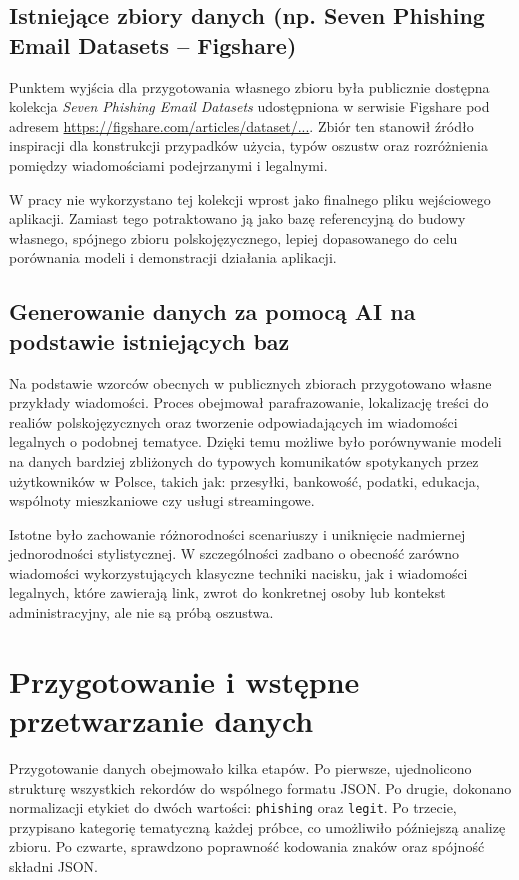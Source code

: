 \documentclass[12pt,a4paper,openany]{report}
\begin{document}
\subsection{Istniejące zbiory danych (np. Seven Phishing Email Datasets -- Figshare)}

Punktem wyjścia dla przygotowania własnego zbioru była publicznie dostępna kolekcja \textit{Seven Phishing Email Datasets} udostępniona w serwisie Figshare pod adresem \href{https://figshare.com/articles/dataset/Seven_Phishing_Email_Datasets/25432108}{https://figshare.com/articles/dataset/...}. Zbiór ten stanowił źródło inspiracji dla konstrukcji przypadków użycia, typów oszustw oraz rozróżnienia pomiędzy wiadomościami podejrzanymi i legalnymi.

W pracy nie wykorzystano tej kolekcji wprost jako finalnego pliku wejściowego aplikacji. Zamiast tego potraktowano ją jako bazę referencyjną do budowy własnego, spójnego zbioru polskojęzycznego, lepiej dopasowanego do celu porównania modeli i demonstracji działania aplikacji.

\subsection{Generowanie danych za pomocą AI na podstawie istniejących baz}

Na podstawie wzorców obecnych w publicznych zbiorach przygotowano własne przykłady wiadomości. Proces obejmował parafrazowanie, lokalizację treści do realiów polskojęzycznych oraz tworzenie odpowiadających im wiadomości legalnych o podobnej tematyce. Dzięki temu możliwe było porównywanie modeli na danych bardziej zbliżonych do typowych komunikatów spotykanych przez użytkowników w Polsce, takich jak: przesyłki, bankowość, podatki, edukacja, wspólnoty mieszkaniowe czy usługi streamingowe.

Istotne było zachowanie różnorodności scenariuszy i uniknięcie nadmiernej jednorodności stylistycznej. W szczególności zadbano o obecność zarówno wiadomości wykorzystujących klasyczne techniki nacisku, jak i wiadomości legalnych, które zawierają link, zwrot do konkretnej osoby lub kontekst administracyjny, ale nie są próbą oszustwa.

\section{Przygotowanie i wstępne przetwarzanie danych}

Przygotowanie danych obejmowało kilka etapów. Po pierwsze, ujednolicono strukturę wszystkich rekordów do wspólnego formatu JSON. Po drugie, dokonano normalizacji etykiet do dwóch wartości: \texttt{phishing} oraz \texttt{legit}. Po trzecie, przypisano kategorię tematyczną każdej próbce, co umożliwiło późniejszą analizę zbioru. Po czwarte, sprawdzono poprawność kodowania znaków oraz spójność składni JSON.
\end{document}
